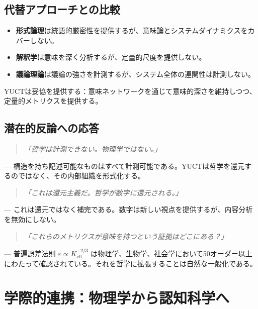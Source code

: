 \documentclass[11pt,a4paper]{article}
\newcommand{\eps}{\varepsilon}
\begin{document}
	\subsection{代替アプローチとの比較}
	
	\begin{itemize}
		\item \textbf{形式論理}は統語的厳密性を提供するが、意味論とシステムダイナミクスをカバーしない。
		\item \textbf{解釈学}は意味を深く分析するが、定量的尺度を提供しない。
		\item \textbf{議論理論}は議論の強さを計測するが、システム全体の連関性は計測しない。
	\end{itemize}
	YUCTは妥協を提供する：意味ネットワークを通じて意味的深さを維持しつつ、定量的メトリクスを提供する。
	
	\subsection{潜在的反論への応答}
	
	\begin{quote}
		\textit{「哲学は計測できない。物理学ではない。」}
	\end{quote}
	— 構造を持ち記述可能なものはすべて計測可能である。YUCTは哲学を還元するのではなく、その内部組織を形式化する。
	
	\begin{quote}
		\textit{「これは還元主義だ。哲学が数字に還元される。」}
	\end{quote}
	— これは還元ではなく補完である。数字は新しい視点を提供するが、内容分析を無効にしない。
	
	\begin{quote}
		\textit{「これらのメトリクスが意味を持つという証拠はどこにある？」}
	\end{quote}
	— 普遍誤差法則 \(\eps \propto K_{\mathrm{eff}}^{-2/3}\) は物理学、生物学、社会学において50オーダー以上にわたって確認されている。それを哲学に拡張することは自然な一般化である。
	
	\section{学際的連携：物理学から認知科学へ}
	\label{sec:interdisciplinary}
	
\end{document}
